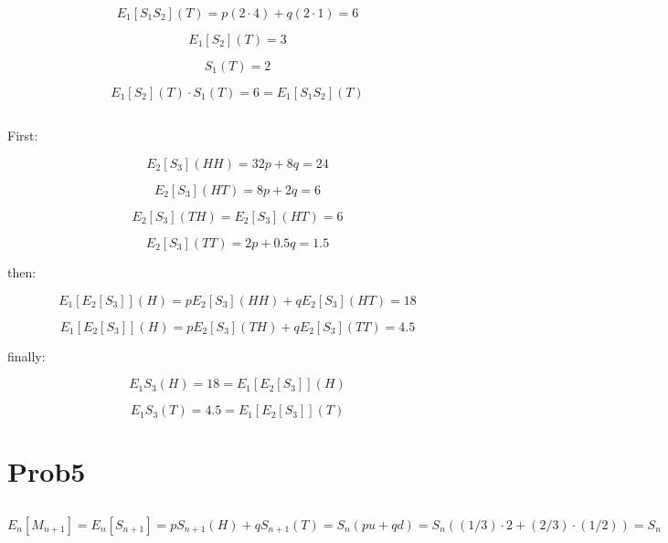 \documentclass[paper=a4, fontsize=11pt]{scrartcl} %
\numberwithin{equation}{section} %
\numberwithin{figure}{section} %
\numberwithin{table}{section} %
\begin{document}
$$ E_{1}[S_{1}S_{2}](T) = p(2 \cdot 4) + q(2 \cdot 1) = 6 $$


$$ E_{1}[S_{2}](T) = 3 $$

$$ S_{1}(T) = 2 $$

$$ E_{1}[S_{2}](T) \cdot S_{1}(T) = 6 = E_{1}[S_{1}S_{2}](T) $$




\subsection{}


First:

$$ E_{2}[S_{3}](HH) = 32p + 8q = 24 $$


$$ E_{2}[S_{3}](HT) = 8p + 2q = 6 $$


$$ E_{2}[S_{3}](TH) = E_{2}[S_{3}](HT) = 6 $$

$$ E_{2}[S_{3}](TT) = 2p + 0.5q = 1.5 $$






then:


$$ E_{1}[E_{2}[S_{3}]](H) = pE_{2}[S_{3}](HH) + qE_{2}[S_{3}](HT) = 18 $$


$$ E_{1}[E_{2}[S_{3}]](H) = pE_{2}[S_{3}](TH) + qE_{2}[S_{3}](TT) = 4.5 $$





finally:

$$ E_{1}S_{3}(H) = 18 = E_{1}[E_{2}[S_{3}]](H) $$

$$ E_{1}S_{3}(T) = 4.5 = E_{1}[E_{2}[S_{3}]](T) $$








\newpage

\section{Prob5}

\subsection{}

$$ E_{n}[M_{n+1}] = E_{n}[S_{n+1}] = pS_{n+1}(H) + qS_{n+1}(T) = S_{n}(pu + qd) = S_{n}((1/3)\cdot 2 + (2/3)\cdot (1/2)) = S_{n} $$
\end{document}
